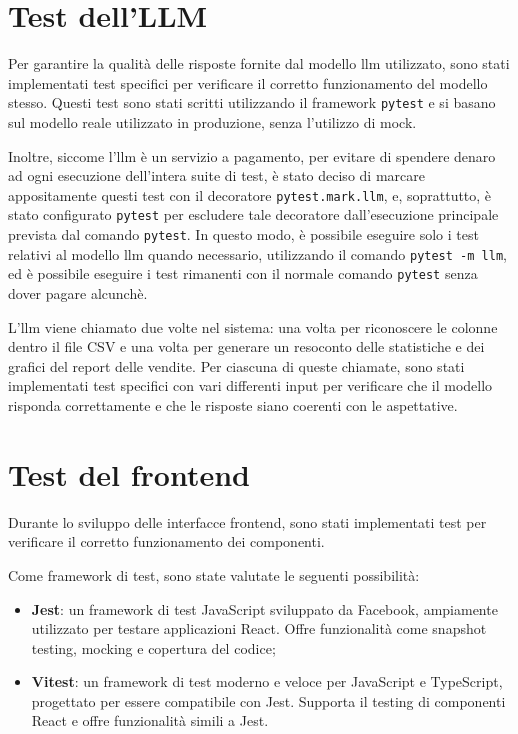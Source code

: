 \section{Test dell’LLM}

Per garantire la qualità delle risposte fornite dal modello \gls{llm} utilizzato, sono stati implementati test specifici per verificare il corretto funzionamento del modello stesso. Questi test sono stati scritti utilizzando il framework \texttt{pytest} e si basano sul modello reale utilizzato in produzione, senza l'utilizzo di mock.

Inoltre, siccome l'\gls{llm} è un servizio a pagamento, per evitare di spendere denaro ad ogni esecuzione dell'intera suite di test, è stato deciso di marcare appositamente questi test con il decoratore \texttt{pytest.mark.llm}, e, soprattutto, è stato configurato \texttt{pytest} per escludere tale decoratore dall'esecuzione principale prevista dal comando \texttt{pytest}.
In questo modo, è possibile eseguire solo i test relativi al modello \gls{llm} quando necessario, utilizzando il comando \texttt{pytest -m llm}, ed è possibile eseguire i test rimanenti con il normale comando \texttt{pytest} senza dover pagare alcunchè.

L'\gls{llm} viene chiamato due volte nel sistema: una volta per riconoscere le colonne dentro il file CSV e una volta per generare un resoconto delle statistiche e dei grafici del report delle vendite. Per ciascuna di queste chiamate, sono stati implementati test specifici con vari differenti input per verificare che il modello risponda correttamente e che le risposte siano coerenti con le aspettative.


\section{Test del frontend}

Durante lo sviluppo delle interfacce frontend, sono stati implementati test per verificare il corretto funzionamento dei componenti. 

Come framework di test, sono state valutate le seguenti possibilità:
\begin{itemize}
    \item \textbf{Jest}: un framework di test JavaScript sviluppato da Facebook, ampiamente utilizzato per testare applicazioni React. Offre funzionalità come snapshot testing, mocking e copertura del codice;
    \item \textbf{Vitest}: un framework di test moderno e veloce per JavaScript e TypeScript, progettato per essere compatibile con Jest. Supporta il testing di componenti React e offre funzionalità simili a Jest.
\end{itemize}

